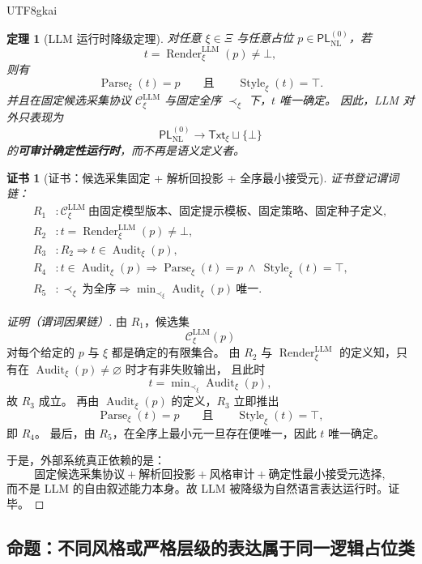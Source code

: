 \documentclass[12pt]{article}
\newtheorem{theorem}{定理}[section]
\newtheorem{Certificate}{证书}[section]
\newcommand{\Parse}{\operatorname{Parse}}
\newcommand{\Audit}{\operatorname{Audit}}
\newcommand{\Render}{\operatorname{Render}}
\newcommand{\Style}{\operatorname{Style}}
\begin{document}
\begin{CJK*}{UTF8}{gkai}
\begin{theorem}[LLM 运行时降级定理]
\label{thm:tex37-runtime-deterministic}
对任意 $\xi\in\Xi$ 与任意占位 $p\in\mathsf{PL}_{\mathrm{NL}}^{(0)}$，若
\[
  t=\Render^{\mathrm{LLM}}_\xi(p)\neq\bot,
\]
则有
\[
  \Parse_\xi(t)=p
  \qquad\text{且}\qquad
  \Style_\xi(t)=\top.
\]
并且在固定候选采集协议 $\mathcal{C}^{\mathrm{LLM}}_\xi$ 与固定全序 $\prec_\xi$ 下，$t$ 唯一确定。
因此，LLM 对外只表现为
\[
  \mathsf{PL}_{\mathrm{NL}}^{(0)}\longrightarrow \mathsf{Txt}_\xi\sqcup\{\bot\}
\]
的\textbf{可审计确定性运行时}，而不再是语义定义者。
\end{theorem}

\begin{Certificate}[证书：候选采集固定 + 解析回投影 + 全序最小接受元]
\label{cert:tex37-runtime-deterministic}
证书登记谓词链：
\[
\begin{aligned}
  R_1 &: \mathcal{C}^{\mathrm{LLM}}_\xi\ \text{由固定模型版本、固定提示模板、固定策略、固定种子定义},\\
  R_2 &: t=\Render^{\mathrm{LLM}}_\xi(p)\neq\bot,\\
  R_3 &: R_2\Rightarrow t\in \Audit_\xi(p),\\
  R_4 &: t\in \Audit_\xi(p)\Rightarrow \Parse_\xi(t)=p\ \wedge\ \Style_\xi(t)=\top,\\
  R_5 &: \prec_\xi\ \text{为全序}\Rightarrow \min\nolimits_{\prec_\xi}\Audit_\xi(p)\ \text{唯一}.
\end{aligned}
\]
\end{Certificate}

\begin{proof}[证明（谓词因果链）]
由 $R_1$，候选集
\[
  \mathcal{C}^{\mathrm{LLM}}_\xi(p)
\]
对每个给定的 $p$ 与 $\xi$ 都是确定的有限集合。
由 $R_2$ 与 $\Render^{\mathrm{LLM}}_\xi$ 的定义知，只有在 $\Audit_\xi(p)\neq\varnothing$ 时才有非失败输出，
且此时
\[
  t=\min\nolimits_{\prec_\xi}\Audit_\xi(p),
\]
故 $R_3$ 成立。
再由 $\Audit_\xi(p)$ 的定义，$R_3$ 立即推出
\[
  \Parse_\xi(t)=p
  \qquad\text{且}\qquad
  \Style_\xi(t)=\top,
\]
即 $R_4$。
最后，由 $R_5$，在全序上最小元一旦存在便唯一，因此 $t$ 唯一确定。

于是，外部系统真正依赖的是：
\[
  \text{固定候选采集协议}
  +\text{解析回投影}
  +\text{风格审计}
  +\text{确定性最小接受元选择},
\]
而不是 LLM 的自由叙述能力本身。故 LLM 被降级为自然语言表达运行时。证毕。
\end{proof}

\subsection{命题：不同风格或严格层级的表达属于同一逻辑占位类}
\label{subsec:tex37-style}


\end{CJK*}
\end{document}
